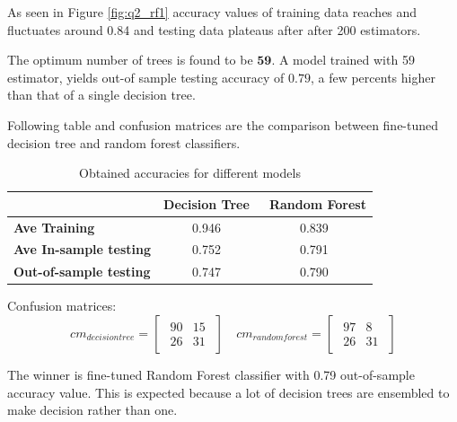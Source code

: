 \documentclass[11pt]{article}
\begin{document}
As seen in Figure \ref{fig:q2_rf1} accuracy values of training data reaches and fluctuates around 0.84 and testing data plateaus after after 200 estimators.\medskip

The optimum number of trees is found to be $\bm{59}$. A model trained with 59 estimator, yields out-of sample testing accuracy of $\bm{0.79}$, a few percents higher than that of a single decision tree. \medskip

Following table and confusion matrices are the comparison between fine-tuned decision tree and random forest classifiers.

\bgroup
\def\arraystretch{1.5}%
\begin{table}[H]
\centering
\caption{Obtained accuracies for different models}
\begin{tabular}{|l|c|c|}
\hline
 &\textbf{Decision Tree}   & \ \textbf{Random Forest}  \\ \hline
\textbf{Ave Training} & 0.946 & 0.839 \\ \hline
\textbf{Ave In-sample testing} & 0.752 & 0.791\\ \hline
\textbf{Out-of-sample testing} & 0.747 & 0.790 \\ \hline
\end{tabular}
\label{table:and}
\end{table}
\egroup

Confusion matrices:
$$
cm_{decision tree}=
 \begin{bmatrix}
 \begin{array}{rr}
90 &  15  \\
26 &  31 
\end{array}   
\end{bmatrix} \quad
cm_{random forest}=
 \begin{bmatrix}
 \begin{array}{rr}
97 &  8  \\
26 &  31 
\end{array}   
\end{bmatrix}
$$

The winner is fine-tuned Random Forest classifier with 0.79 out-of-sample accuracy value. This is expected because a lot of decision trees are ensembled to make decision rather than one. 
\end{document}

